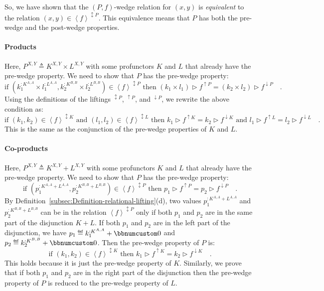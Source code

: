So, we have shown that the $\left(P,f\right)$-wedge relation for
$(x,y)$ is \emph{equivalent} to the relation $(x,y)\in\left<f\right>^{\updownarrow P}$.
This equivalence means that $P$ has both the pre-wedge and the post-wedge
properties.

\paragraph{Products}

Here, $P^{X,Y}\triangleq K^{X,Y}\times L^{X,Y}$ with some profunctors
$K$ and $L$ that already have the pre-wedge property. We need to
show that $P$ has the pre-wedge property:
\[
\text{if }(k_{1}^{:K^{A,A}}\times l_{1}^{:L^{A,A}},k_{2}^{:K^{B,B}}\times l_{2}^{:L^{B,B}})\in\left<f\right>^{\updownarrow P}\text{ then }(k_{1}\times l_{1})\triangleright f^{\uparrow P}=(k_{2}\times l_{2})\triangleright f^{\downarrow P}\quad.
\]
Using the definitions of the liftings $^{\updownarrow P}$, $^{\uparrow P}$,
and $^{\downarrow P}$, we rewrite the above condition as:
\[
\text{if }(k_{1},k_{2})\in\left<f\right>^{\updownarrow K}\text{ and }(l_{1},l_{2})\in\left<f\right>^{\updownarrow L}\text{ then }k_{1}\triangleright f^{\uparrow K}=k_{2}\triangleright f^{\downarrow K}\text{ and }l_{1}\triangleright f^{\uparrow L}=l_{2}\triangleright f^{\downarrow L}\quad.
\]
This is the same as the conjunction of the pre-wedge properties of
$K$ and $L$.

\paragraph{Co-products}

Here, $P^{X,Y}\triangleq K^{X,Y}+L^{X,Y}$ with some profunctors $K$
and $L$ that already have the pre-wedge property. We need to show
that $P$ has the pre-wedge property:
\[
\text{if }(p_{1}^{:K^{A,A}+L^{A,A}},p_{2}^{:K^{B,B}+L^{B,B}})\in\left<f\right>^{\updownarrow P}\text{ then }p_{1}\triangleright f^{\uparrow P}=p_{2}\triangleright f^{\downarrow P}\quad.
\]
By Definition~\ref{subsec:Definition-relational-lifting}(d), two
values $p_{1}^{:K^{A,A}+L^{A,A}}$ and $p_{2}^{:K^{B,B}+L^{B,B}}$
can be in the relation $\left<f\right>^{\updownarrow P}$ only if
both $p_{1}$ and $p_{2}$ are in the same part of the disjunction
$K+L$. If both $p_{1}$ and $p_{2}$ are in the left part of the
disjunction, we have $p_{1}\triangleq k_{1}^{:K^{A,A}}+\bbnum 0$
and $p_{2}\triangleq k_{2}^{:K^{B,B}}+\bbnum 0$. Then the pre-wedge
property of $P$ is:
\[
\text{if }(k_{1},k_{2})\in\left<f\right>^{\updownarrow K}\text{ then }k_{1}\triangleright f^{\uparrow K}=k_{2}\triangleright f^{\downarrow K}\quad.
\]
This holds because it is just the pre-wedge property of $K$. Similarly,
we prove that if both $p_{1}$ and $p_{2}$ are in the right part
of the disjunction then the pre-wedge property of $P$ is reduced
to the pre-wedge property of $L$.

